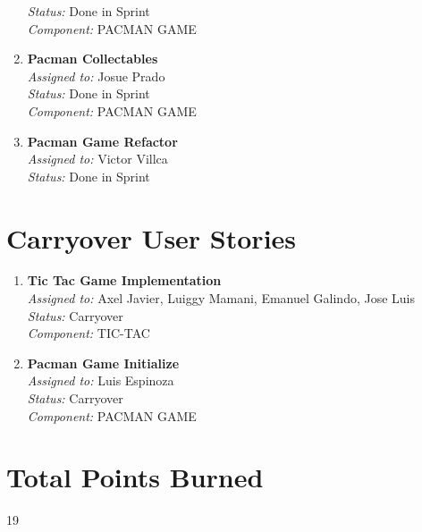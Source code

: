 \documentclass{article}
\begin{document}
\begin{enumerate}
        \textit{Status:} Done in Sprint \\
        \textit{Component:} PACMAN GAME
        \item \textbf{Pacman Collectables} \\
        \textit{Assigned to:} Josue Prado \\
        \textit{Status:} Done in Sprint \\
        \textit{Component:} PACMAN GAME
        \item \textbf{Pacman Game Refactor } \\
        \textit{Assigned to:} Victor Villca \\
        \textit{Status:} Done in Sprint \\
    \end{enumerate}

    \section*{Carryover User Stories}

    \begin{enumerate}
        \item \textbf{Tic Tac Game Implementation} \\
        \textit{Assigned to:} Axel Javier, Luiggy Mamani, Emanuel Galindo, Jose Luis \\
        \textit{Status:} Carryover \\
        \textit{Component:} TIC-TAC
        \item \textbf{Pacman Game Initialize } \\
        \textit{Assigned to:} Luis Espinoza \\
        \textit{Status:} Carryover \\
        \textit{Component:} PACMAN GAME

    \end{enumerate}

    \section*{Total Points Burned}
    19
\end{document}
